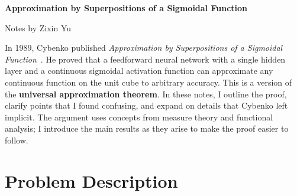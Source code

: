 \documentclass[12pt]{article}
\begin{document}
\begin{center}
\begin{large}
\textbf{Approximation by Superpositions of a Sigmoidal Function}\\
\end{large}
Notes by Zixin Yu
\end{center}

In 1989, Cybenko published \emph{Approximation by Superpositions of a Sigmoidal Function}~\cite{1}. He proved that a feedforward neural network with a single hidden layer and a continuous sigmoidal activation function can approximate any continuous function on the unit cube to arbitrary accuracy. This is a version of the \textbf{universal approximation theorem}. In these notes, I outline the proof, clarify points that I found confusing, and expand on details that Cybenko left implicit. The argument uses concepts from measure theory and functional analysis; I introduce the main results as they arise to make the proof easier to follow.

\section{Problem Description}

\begin{figure}[H]
    \centering
{}
\end{figure}
\end{document}
